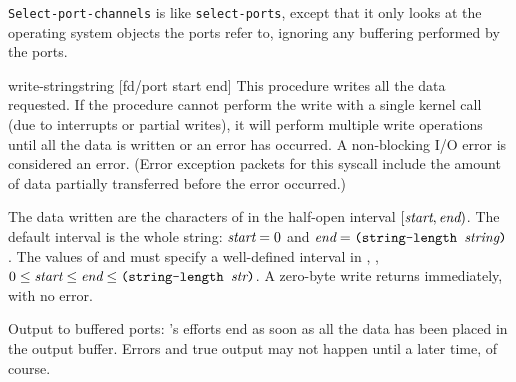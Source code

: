 \begin{desc}
  \texttt{Select-port-channels} is like \texttt{select-ports}, except
  that it only looks at the operating system objects the ports refer
  to, ignoring any buffering performed by the ports.

\end{desc}

\begin{defundescx}{write-string}{string [fd/port start end]}\undefined
    This procedure writes all the data requested. 
    If the procedure cannot perform the write with a single kernel call
    (due to interrupts or partial writes),
    it will perform multiple write operations until all the data is written
    or an error has occurred.
    A non-blocking I/O error is considered an error.
    (Error exception packets for this syscall include the amount of
     data partially transferred before the error occurred.)

    The data written are the characters of  in the half-open
    interval $[\var{start},\var{end})$.
    The default interval is the whole string: $\var{start}=0$ and
    $\var{end}=\ex{(string-length \var{string})}$.
    The values of  and  must specify a well-defined
    interval in , 
    \ie, $0 \le \var{start} \le \var{end} \le \ex{(string-length \var{str})}$.
    A zero-byte write returns immediately, with no error.

    Output to buffered ports: 's efforts end as soon
    as all the data has been placed in the output buffer.
    Errors and true output may not happen until a later time, of course.
\end{defundescx}

